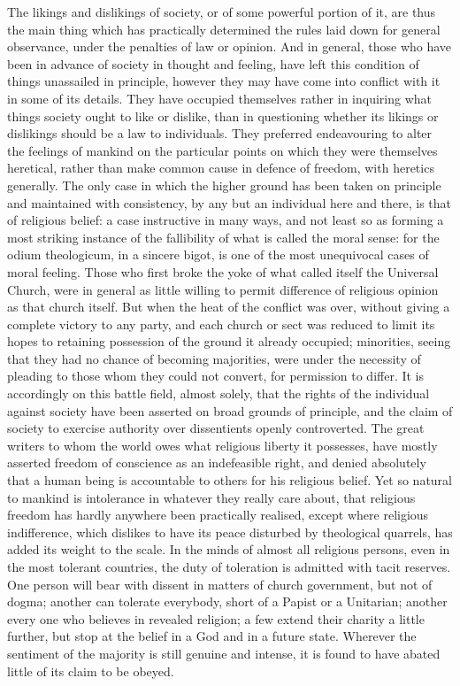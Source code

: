 \documentclass[11pt,openany]{book}
\begin{document}
The likings and dislikings of society, or of some powerful portion of it, are thus the main thing which has practically determined the rules laid down for general observance, under the penalties of law or opinion. And in general, those who have been in advance of society in thought and feeling, have left this condition of things unassailed in principle, however they may have come into conflict with it in some of its details. They have occupied themselves rather in inquiring what things society ought to like or dislike, than in questioning whether its likings or dislikings should be a law to individuals. They preferred endeavouring to alter the feelings of mankind on the particular points on which they were themselves heretical, rather than make common cause in defence of freedom, with heretics generally. The only case in which the higher ground has been taken on principle and maintained with consistency, by any but an individual here and there, is that of religious belief: a case instructive in many ways, and not least so as forming a most striking instance of the fallibility of what is called the moral sense: for the odium theologicum, in a sincere bigot, is one of the most unequivocal cases of moral feeling. Those who first broke the yoke of what called itself the Universal Church, were in general as little willing to permit difference of religious opinion as that church itself. But when the heat of the conflict was over, without giving a complete victory to any party, and each church or sect was reduced to limit its hopes to retaining possession of the ground it already occupied; minorities, seeing that they had no chance of becoming majorities, were under the necessity of pleading to those whom they could not convert, for permission to differ. It is accordingly on this battle field, almost solely, that the rights of the individual against society have been asserted on broad grounds of principle, and the claim of society to exercise authority over dissentients openly controverted. The great writers to whom the world owes what religious liberty it possesses, have mostly asserted freedom of conscience as an indefeasible right, and denied absolutely that a human being is accountable to others for his religious belief. Yet so natural to mankind is intolerance in whatever they really care about, that religious freedom has hardly anywhere been practically realised, except where religious indifference, which dislikes to have its peace disturbed by theological quarrels, has added its weight to the scale. In the minds of almost all religious persons, even in the most tolerant countries, the duty of toleration is admitted with tacit reserves. One person will bear with dissent in matters of church government, but not of dogma; another can tolerate everybody, short of a Papist or a Unitarian; another every one who believes in revealed religion; a few extend their charity a little further, but stop at the belief in a God and in a future state. Wherever the sentiment of the majority is still genuine and intense, it is found to have abated little of its claim to be obeyed.
\end{document}
